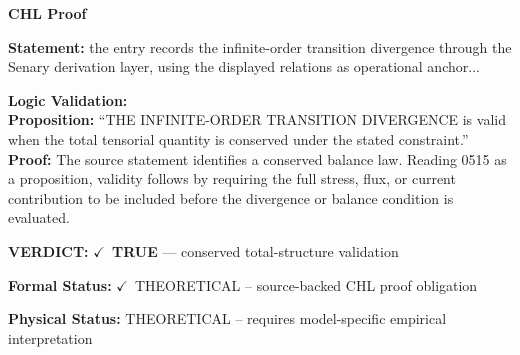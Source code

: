 \vspace{0.45em}
\noindent\textbf{CHL Proof}\par
\textbf{Statement:} the entry records the infinite-order transition divergence through the Senary derivation
layer, using the displayed relations as operational anchor...

\textbf{Logic Validation:}\\
\textbf{Proposition:} ``THE INFINITE-ORDER TRANSITION DIVERGENCE is valid when the total tensorial quantity is
conserved under the stated constraint.''\\
\textbf{Proof:} The source statement identifies a conserved balance law. Reading 0515 as a proposition,
validity follows by requiring the full stress, flux, or current contribution to be
included before the divergence or balance condition is evaluated.

\textbf{VERDICT:} \ensuremath{\checkmark}\ \textbf{TRUE} --- conserved total-structure validation

\textbf{Formal Status:} \ensuremath{\checkmark}\ THEORETICAL -- source-backed CHL proof obligation

\textbf{Physical Status:} THEORETICAL -- requires model-specific empirical interpretation
\par\vspace{0.45em}
\par
\ifTZPDarkEdition
{}
\fi
\endgroup
\endgroup
